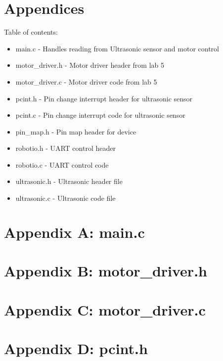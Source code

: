 \documentclass[letterpaper,11pt]{texMemo} %
\begin{document}
\section*{Appendices}
Table of contents:
\begin{itemize}
    \item main.c - Handles reading from Ultrasonic sensor and motor control
    \item motor\_driver.h - Motor driver header from lab 5
    \item motor\_driver.c - Motor driver code from lab 5
    \item pcint.h - Pin change interrupt header for ultrasonic sensor
    \item pcint.c - Pin change interrupt code for ultrasonic sensor
    \item pin\_map.h - Pin map header for device
    \item robotio.h - UART control header
    \item robotio.c - UART control code
    \item ultrasonic.h - Ultrasonic header file
    \item ultrasonic.c - Ultrasonic code file
\end{itemize}
\newpage

\section*{Appendix A: main.c}
\begin{tiny}

\end{tiny}
\newpage

\section*{Appendix B: motor\_driver.h}
\begin{tiny}

\end{tiny}
\newpage

\section*{Appendix C: motor\_driver.c}
\begin{tiny}

\end{tiny}
\newpage

\section*{Appendix D: pcint.h}
\begin{tiny}

\end{tiny}
\newpage
\end{document}
